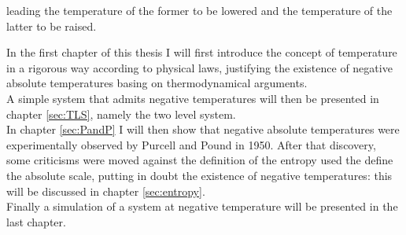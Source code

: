 leading the temperature of the former to be lowered and the temperature of the latter to be raised. \par
\vspace{10pt}
In the first chapter of this thesis I will first introduce the concept of temperature in a rigorous way according to physical laws, justifying the existence of negative absolute temperatures basing on thermodynamical arguments. \\
A simple system that admits negative temperatures will then be presented in chapter \ref{sec:TLS}, namely the two level system. \\
In chapter \ref{sec:PandP} I will then show that negative absolute temperatures were experimentally observed by Purcell and Pound in 1950. 
After that discovery, some criticisms were moved against the definition of the entropy used the define the absolute scale, putting in doubt the existence of negative temperatures: this will be discussed in chapter \ref{sec:entropy}. \\
Finally a simulation of a system at negative temperature will be presented in the last chapter.